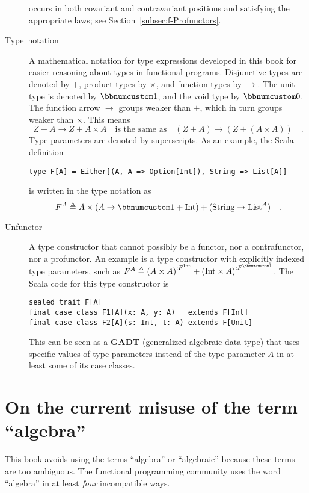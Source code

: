 \begin{description}
occurs in both covariant and contravariant positions and satisfying
the appropriate laws; see Section~\ref{subsec:f-Profunctors}.
\item [{Type~notation}] A mathematical notation
for type expressions developed in this book for easier reasoning about
types in functional programs. Disjunctive types are denoted by $+$,
product types by $\times$, and function types by $\rightarrow$.
The unit type is denoted by $\bbnum 1$, and the void type by $\bbnum 0$.
The function arrow $\rightarrow$ groups weaker than $+$, which in
turn groups weaker than $\times$. This means
\[
Z+A\rightarrow Z+A\times A\quad\text{is the same as}\quad\left(Z+A\right)\rightarrow\left(Z+\left(A\times A\right)\right)\quad.
\]
 Type parameters are denoted by superscripts. As an example, the Scala
definition\texttt{}
\begin{lstlisting}
type F[A] = Either[(A, A => Option[Int]), String => List[A]]
\end{lstlisting}
is written in the type notation as 
\[
F^{A}\triangleq A\times\left(A\rightarrow\bbnum 1+\text{Int}\right)+(\text{String}\rightarrow\text{List}^{A})\quad.
\]
\item [{\index{unfunctor}Unfunctor}] A type constructor that cannot possibly
be a functor, nor a contrafunctor, nor a profunctor. An example is
a type constructor with explicitly indexed type parameters, such as
$F^{A}\triangleq\left(A\times A\right)^{:F^{\text{Int}}}+\left(\text{Int}\times A\right)^{:F^{\bbnum 1}}$.
The Scala code for this type constructor is
\begin{lstlisting}
sealed trait F[A]
final case class F1[A](x: A, y: A)   extends F[Int]
final case class F2[A](s: Int, t: A) extends F[Unit]
\end{lstlisting}
This can be seen as a \textbf{GADT}
(generalized algebraic data type) that uses specific values of type
parameters instead of the type parameter $A$ in at least some of
its case classes.
\end{description}

\section{On the current misuse of the term \textsf{``}algebra\textsf{''}}

This book avoids using the terms \textsf{``}algebra\textsf{''} or
\textsf{``}algebraic\textsf{''} because these terms are too ambiguous.
The functional programming community uses the word \textsf{``}algebra\textsf{''} in
at least \emph{four} incompatible ways.

